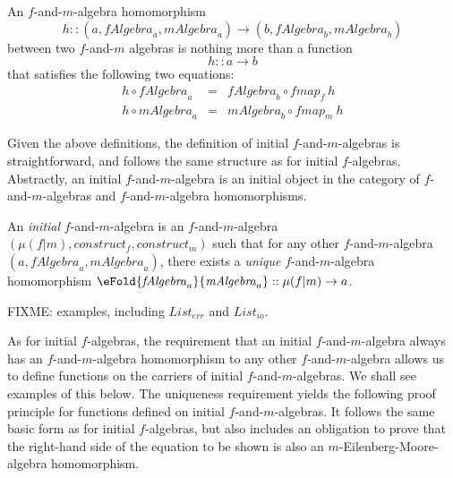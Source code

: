 \begin{definition}
  An $f$-and-$m$-algebra homomorphism
  \begin{displaymath}
    h :: (a, \mathit{fAlgebra}_a, \mathit{mAlgebra}_a) \to (b, \mathit{fAlgebra}_b, \mathit{mAlgebra}_b)
  \end{displaymath}
  between two $f$-and-$m$ algebras is nothing more than a function
  \begin{displaymath}
    h :: a \to b
  \end{displaymath}
  that satisfies the following two equations:
  \begin{displaymath}
    \begin{array}{rcl}
      h \circ \mathit{fAlgebra}_a & = & \mathit{fAlgebra}_b \circ \mathit{fmap}_f~h \\
      h \circ \mathit{mAlgebra}_a & = & \mathit{mAlgebra}_b \circ \mathit{fmap}_m~h
    \end{array}
  \end{displaymath}
\end{definition}

Given the above definitions, the definition of initial
$f$-and-$m$-algebras is straightforward, and follows the same
structure as for initial $f$-algebras. Abstractly, an initial
$f$-and-$m$-algebra is an initial object in the category of
$f$-and-$m$-algebras and $f$-and-$m$-algebra homomorphisms.

\begin{definition}
  An \emph{initial} $f$-and-$m$-algebra is an $f$-and-$m$-algebra
  $(\mu(f|m), \mathit{construct}_f, \mathit{construct}_m)$ such that
  for any other $f$-and-$m$-algebra $(a, \mathit{fAlgebra}_a,
  \mathit{mAlgebra}_a)$, there exists a \emph{unique}
  $f$-and-$m$-algebra homomorphism
  $\eFold{\mathit{fAlgebra}_a}{\mathit{mAlgebra}_a} :: \mu(f|m) \to
  a$.
\end{definition}

FIXME: examples, including $\mathit{List_{err}}$ and $\mathit{List_{io}}$.

As for initial $f$-algebras, the requirement that an initial
$f$-and-$m$-algebra always has an $f$-and-$m$-algebra homomorphism to
any other $f$-and-$m$-algebra allows us to define functions on the
carriers of initial $f$-and-$m$-algebras. We shall see examples of
this below. The uniqueness requirement yields the following proof
principle for functions defined on initial $f$-and-$m$-algebras. It
follows the same basic form as  for
initial $f$-algebras, but also includes an obligation to prove that
the right-hand side of the equation to be shown is also an
$m$-Eilenberg-Moore-algebra homomorphism.

